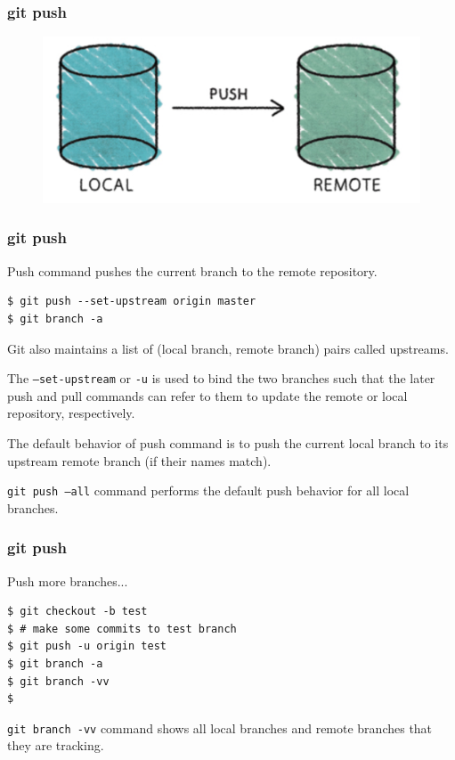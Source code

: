 \documentclass{beamer}
\begin{document}
\begin{frame}[fragile]
\frametitle{git push}
\begin{figure}

  \includegraphics[scale=0.3]{figures/f6.png}
\end{figure}
\end{frame}


\begin{frame}[fragile]
\frametitle{git push}

Push command pushes the current branch to the remote repository.

\begin{lstlisting}
$ git push --set-upstream origin master 
$ git branch -a
\end{lstlisting}

Git also maintains a list of (local branch, remote branch) pairs
called upstreams.

The \texttt{---set-upstream} or \texttt{-u} is used to bind the two
branches such that the later push and pull commands can refer to them
to update the remote or local repository, respectively.

The default behavior of push command is to push the current local
branch to its upstream remote branch (if their names match).

\texttt{git push ---all} command performs the default push behavior
for all local branches.


\end{frame}

\begin{frame}[fragile]
\frametitle{git push}

Push more branches...

\begin{lstlisting}
$ git checkout -b test
$ # make some commits to test branch
$ git push -u origin test 
$ git branch -a
$ git branch -vv
$ 
\end{lstlisting}

\texttt{git branch -vv} command shows all local branches and remote
branches that they are tracking.

\end{frame}
\end{document}
